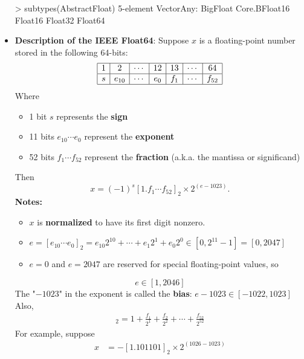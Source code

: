 \documentclass{report}
\begin{document}
\begin{itemize}
\begin{jlcode}
            > subtypes(AbstractFloat)
             5-element Vector{Any}:
             BigFloat
             Core.BFloat16
             Float16
             Float32
             Float64           
         \end{jlcode}
     \item \textbf{Description of the IEEE Float64}: Suppose $x$ is a floating-point number stored in the following 64-bits:
         $$
         \begin{array}{|c|c|c|c|c|c|c|}
             \hline
             1 & 2 & \cdots & 12 & 13 & \cdots & 64 \\
             \hline
             s & e_{10} & \cdots & e_0 & f_1 & \cdots & f_{52} \\
             \hline
         \end{array}
         $$
         Where
         \begin{itemize}
             \item 1 bit $s$ represents the \textbf{sign}
             \item 11 bits $e_{10} \cdots e_{0}$ represent the \textbf{exponent}
             \item 52 bits $f_1 \cdots f_{52}$ represent the \textbf{fraction} (a.k.a. the mantissa or significand)
         \end{itemize}
         Then
         $$ x = (-1)^s [1.f_1 \cdots f_{52}]_2 \times 2^{(e-1023)}.$$
         \bigbreak \noindent 
         \textbf{Notes:}
         \begin{itemize}
             \item $x$ is \textbf{normalized} to have its first digit nonzero.
             \item $e = [e_{10} \cdots e_{0}]_2 = e_{10} 2^{10} + \cdots + e_1 2^1 + e_0 2^0 \in \left[0, 2^{11}-1\right] = [0, 2047]$
             \item $e = 0$ and $e = 2047$ are reserved for special floating-point values, so 
         \end{itemize}
         $$e \in [1, 2046]$$
     The "$-1023$" in the exponent is called the \textbf{bias}:  $e-1023 \in [-1022,1023]$
     \bigbreak \noindent 
     Also, 
     \begin{align*}
         [1.f_1 \cdots f_{52}]_2 = 1 + \frac{f_1}{2^1} + \frac{f_2}{2^2} + \cdots + \frac{f_{52}}{2^{52}}
     \end{align*}
     \bigbreak \noindent 
     For example, suppose
     \begin{align*}
         x & = -[1.101101]_2 \times 2^{(1026-1023)} \\

\end{align*}
\end{itemize}
\end{document}
